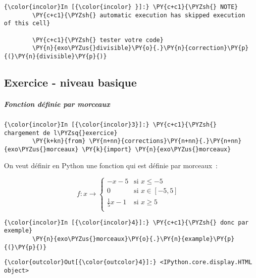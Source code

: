     \begin{Verbatim}[commandchars=\\\{\}]
{\color{incolor}In [{\color{incolor} }]:} \PY{c+c1}{\PYZsh{} NOTE}
        \PY{c+c1}{\PYZsh{} automatic execution has skipped execution of this cell}
        
        \PY{c+c1}{\PYZsh{} tester votre code}
        \PY{n}{exo\PYZus{}divisible}\PY{o}{.}\PY{n}{correction}\PY{p}{(}\PY{n}{divisible}\PY{p}{)}
\end{Verbatim}


    \hypertarget{exercice---niveau-basique}{%
\subsection{Exercice - niveau basique}\label{exercice---niveau-basique}}

    \hypertarget{fonction-duxe9finie-par-morceaux}{%
\subparagraph{Fonction définie par
morceaux}\label{fonction-duxe9finie-par-morceaux}}

    \begin{Verbatim}[commandchars=\\\{\}]
{\color{incolor}In [{\color{incolor}3}]:} \PY{c+c1}{\PYZsh{} chargement de l\PYZsq{}exercice}
        \PY{k+kn}{from} \PY{n+nn}{corrections}\PY{n+nn}{.}\PY{n+nn}{exo\PYZus{}morceaux} \PY{k}{import} \PY{n}{exo\PYZus{}morceaux}
\end{Verbatim}


    On veut définir en Python une fonction qui est définie par morceaux~:

    \[
f: x \longrightarrow \left\{
\begin{array}{ll}
-x - 5          & \mbox{si } x \leqslant -5 \\
0               & \mbox{si } x \in [-5, 5]  \\
\frac{1}{5}x -1 & \mbox{si } x \geqslant 5  \\
\end{array}
\right.
\]

    \begin{Verbatim}[commandchars=\\\{\}]
{\color{incolor}In [{\color{incolor}4}]:} \PY{c+c1}{\PYZsh{} donc par exemple}
        \PY{n}{exo\PYZus{}morceaux}\PY{o}{.}\PY{n}{example}\PY{p}{(}\PY{p}{)}
\end{Verbatim}


\begin{Verbatim}[commandchars=\\\{\}]
{\color{outcolor}Out[{\color{outcolor}4}]:} <IPython.core.display.HTML object>
\end{Verbatim}
            
